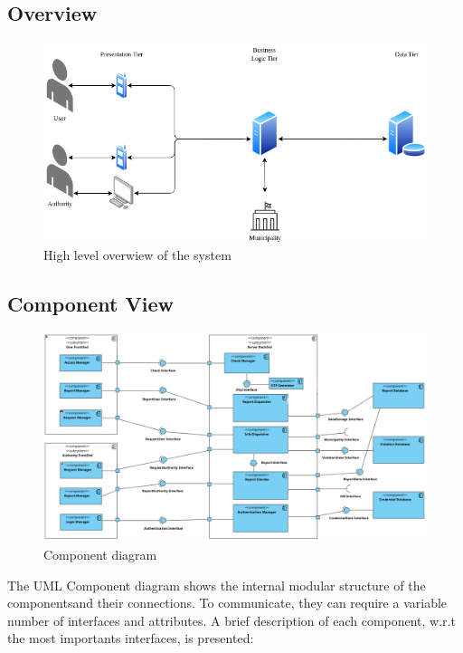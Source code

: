 \subsection{Overview}

    \begin{figure}[H]
        \includegraphics[width=\textwidth]{Images/SystemOverview.png}
        \caption{\label{fig:SystemOverview}High level overwiew of the system}
    \end{figure}
   
\newpage

\subsection{Component View}

    \begin{figure}[H]
        \includegraphics[width=\textwidth]{Images/ComponentView.png}
        \caption{\label{fig:ComponentView}Component diagram}
    \end{figure}

    The UML Component diagram shows the internal modular structure of the componentsand their connections. 
    To communicate, they can require a variable number of interfaces and attributes. 
    A brief description of each component, w.r.t the most importants interfaces, is presented:

